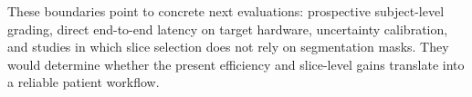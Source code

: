 These boundaries point to concrete next evaluations: prospective subject-level grading, direct end-to-end latency on target hardware, uncertainty calibration, and studies in which slice selection does not rely on segmentation masks. They would determine whether the present efficiency and slice-level gains translate into a reliable patient workflow.
